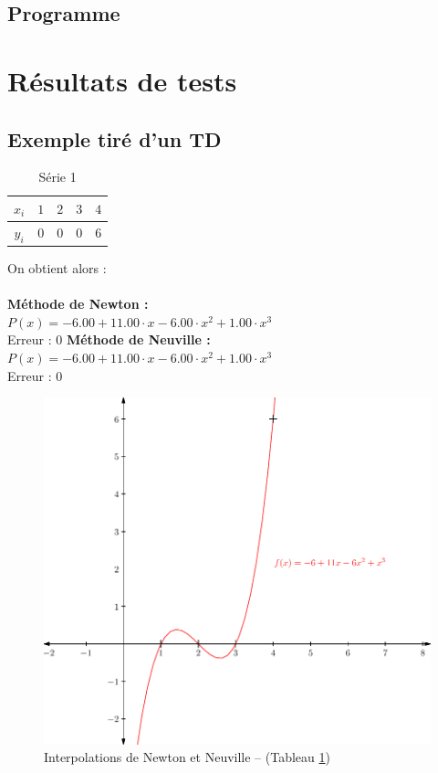 \documentclass{report}
\begin{document}
      \subsection{Programme}
	
    \newpage
    \section{Résultats de tests}
      \subsection{Exemple tiré d'un TD}
	\begin{table}[h]
	  \centering
	  \begin{tabular}{| c | c | c | c | c |}
	  \hline 
	  $x_{i}$ & $1$ & $2$ & $3$ & $4$ \\ 
	  \hline 
	  $y_{i}$ & $0$ & $0$ & $0$ & $6$ \\ 
	  \hline 
	  \end{tabular}
	  \caption{Série 1}
	  \label{inter_td3_ex3}
	\end{table}
	
	On obtient alors :\\ \\
	\textbf{Méthode de Newton :}\\
	$P(x)= -6.00 + 11.00 \cdot x- 6.00 \cdot x^{2}  + 1.00 \cdot x^{3} $\\
	Erreur : $0$
	\newline
	\newline
	\textbf{Méthode de Neuville :}\\
	$P(x)= -6.00 + 11.00 \cdot x- 6.00 \cdot x^{2}  + 1.00 \cdot x^{3} $\\
	Erreur : $0$
	\newline
	\newline
	
	\begin{figure}[h]
	  \centering
	  \includegraphics[scale=0.7]{graphiques/pdf_output/inter_test1.pdf}
	  \caption{Interpolations de Newton et Neuville -- (Tableau \ref{inter_td3_ex3})}
	\end{figure}
      \newpage
      
\end{document}
